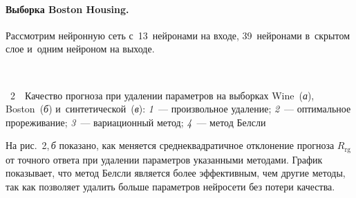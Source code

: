 \begin{multicols}{2}
  



\vspace*{-9pt}

\paragraph*{Выборка Boston Housing.} Рассмотрим нейронную сеть с~13~нейронами на 
входе, 39~нейронами в~скрытом слое и~одним нейроном на выходе.


{ \begin{center}  %
 \vspace*{-6pt}
  \mbox{%
 \epsfxsize=78mm %
 }


\end{center}

\vspace*{-9pt}


\noindent
{{\figurename~2}\ \ \small{Качество прогноза при удалении 
па\-ра\-мет\-ров на выборках Wine~(\textit{а}),
Boston~(\textit{б}) и~синтетической~(\textit{в}):
\textit{1}~--- произвольное удаление; \textit{2}~--- оптимальное прореживание;
\textit{3}~--- вариационный метод; \textit{4}~--- метод Белсли}}
}

\vspace*{9pt}

\addtocounter{figure}{1}


На рис.~2,\,\textit{б} показано, как меняется сред\-не\-квад\-ра\-тич\-ное отклонение 
прогноза $R_{\mathrm{rg}}$ от точного ответа  при удалении па\-ра\-мет\-ров указанными 
методами.
%
 График показывает, что метод Белсли является
более эффективным, чем 
другие методы, так как
поз\-во\-ляет удалить больше па\-ра\-мет\-ров нейросети без потери 
качества.

\pagebreak

\end{multicols}

